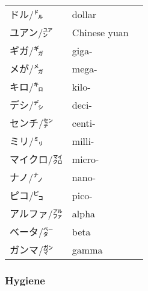 \documentclass[../nihongo-gakushuu-kyouzai.tex]{subfiles}
\begin{document}
\begin{multicols}{2}
\begin{center}
{\begin{tabular}{@{}lll@{}}
    ドル/㌦ & dollar & \\
    ユアン/㍐ & Chinese yuan & \\
    \midrule
    \midrule
    ギガ/㌐ & giga- & \\
    メが/㍋ & mega- & \\
    キロ/㌔ & kilo- & \\
    デシ/㌥ & deci- & \\
    センチ/㌢ & centi- & \\
    ミリ/㍉ & milli- & \\
    マイクロ/㍃ & micro- & \\
    ナノ/㌨ & nano- & \\
    ピコ/㌰ & pico- & \\
    \midrule
    \midrule
    アルファ/㌁ & alpha & \\
    ベータ/㌼ & beta & \\
    ガンマ/㌏ & gamma & \\
    \bottomrule
\end{tabular}%
}
\label{tbl:appendix-vocab-nouns-physical-units}
\end{center}


\subsubsection{Hygiene}
\begin{center}
\label{tbl:appendix-vocab-nouns-hygiene}
\end{center}

\end{multicols}
\end{document}
